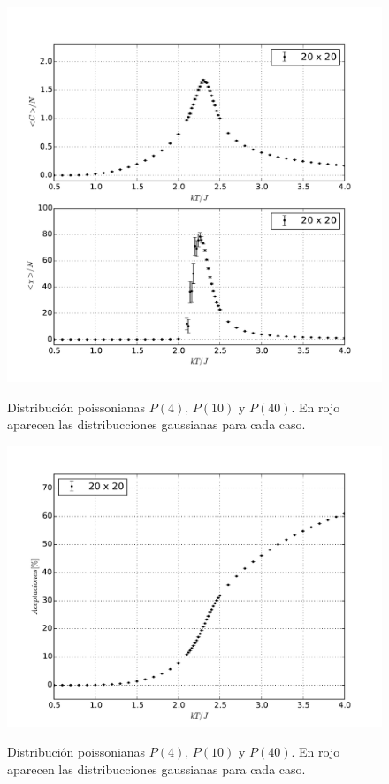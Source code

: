 \documentclass[a4paper,12pt]{article}
\begin{document}
\begin{figure}[H]
    \begin{center}
      \includegraphics[scale=0.6]{fluctuaciones.pdf} \\
      \caption{Distribución poissonianas $P(4)$, $P(10)$ y $P(40)$. En rojo 
      aparecen las distribucciones gaussianas para cada 
      caso.}\label{fig:fluctuaciones}
    \end{center}
\end{figure}

\begin{figure}[H]
    \begin{center}
      \includegraphics[scale=0.5]{aceptaciones.pdf} \\
      \caption{Distribución poissonianas $P(4)$, $P(10)$ y $P(40)$. En rojo 
      aparecen las distribucciones gaussianas para cada 
      caso.}\label{fig:aceptaciones}
    \end{center}
\end{figure}
\end{document}

